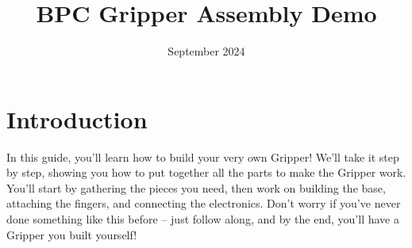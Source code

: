 \documentclass{article}
\title{BPC Gripper Assembly Demo}
\author{}
\date{September 2024}
\begin{document}
\maketitle

\section{Introduction}
In this guide, you’ll learn how to build your very own Gripper! We’ll take it step by step, showing you how to put together all the parts to make the Gripper work. You’ll start by gathering the pieces you need, then work on building the base, attaching the fingers, and connecting the electronics. Don’t worry if you’ve never done something like this before – just follow along, and by the end, you’ll have a Gripper you built yourself!
\end{document}
